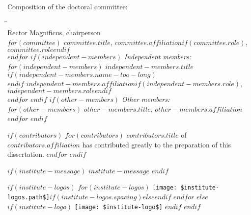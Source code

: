 \begin{titlepage}
    \bigskip
    \noindent Composition of the doctoral committee:
    \begin{tabbing}
        \hspace{\tabcolsep}\=\hspace{0.33\textwidth}\=\hspace{0.66\textwidth}                   \\[-3\medskipamount]
        \> Rector Magnificus,          \> chairperson\\
$for(committee)$
        \> $committee.title$,    \> $committee.affiliation$$if(committee.role)$, \textit{$committee.role$}$endif$    \\
$endfor$
$if(independent-members)$
        \>\textit{Independent members:}                                                        \\[\smallskipamount]
$for(independent-members)$
        \>$independent-members.title$$if(independent-members.name-too-long)$\\
        \>$endif$       \> $independent-members.affiliation$$if(independent-members.role)$, $independent-members.role$$endif$                         \\
$endfor$
$endif$
$if(other-members)$
        \>\textit{Other members:}                                                               \\[\smallskipamount]
$for(other-members)$
        \>$other-members.title$, \> $other-members.affiliation$                         \\
$endfor$
$endif$
    \end{tabbing}

$if(contributors)$
    \medskip
$for(contributors)$
    \noindent $contributors.title$ of $contributors.affiliation$ has contributed greatly to the preparation of this dissertation.
$endfor$
$endif$

$if(institute-message)$
    \medskip
    \noindent $institute-message$
$endif$

    \vfill
        \begin{center}
        $if(institute-logos)$
        $for(institute-logos)$
                \texttt{[image: \$institute-logos.path\$]}$if(institute-logos.spacing)$\hspace{$institute-logos.spacing$}$else$\hspace{1cm}$endif$
        $endfor$
        $else$
        $if(institute-logo)$
                \texttt{[image: \$institute-logo\$]}
        $endif$
        $endif$
        \end{center}
    \vfill


\end{titlepage}
